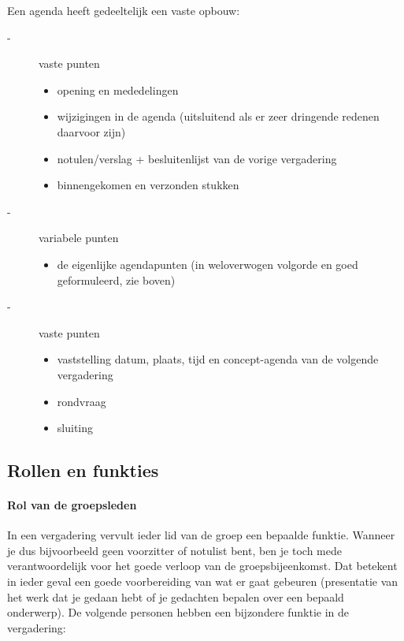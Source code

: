 Een agenda heeft gedeeltelijk een vaste opbouw:
\begin{description}
\item[-]
vaste punten
\begin{itemize}
               \item    opening en mededelingen
               \item    wijzigingen in de agenda (uitsluitend als
                    er zeer dringende redenen daarvoor zijn)
               \item    notulen/verslag + besluitenlijst van de
                    vorige vergadering
               \item    binnengekomen en verzonden stukken
\end{itemize}
\item[-]
variabele punten
\begin{itemize}
              \item    de eigenlijke agendapunten (in weloverwogen
                    volgorde en goed geformuleerd, zie
                    boven)
\end{itemize}
\item[-]
vaste punten
\begin{itemize}
                \item    vaststelling datum, plaats, tijd en 
                    concept-agenda van de volgende vergadering
               \item    rondvraag
               \item    sluiting
\end{itemize}
\end{description}


\subsection{Rollen en funkties}

\paragraph{Rol van de groepsleden}
In een vergadering vervult ieder lid van de groep een bepaalde
funktie. Wanneer je dus bijvoorbeeld geen voorzitter of notulist bent, ben je toch mede verantwoordelijk voor het goede
verloop van de groepsbijeenkomst. Dat betekent in ieder geval
een goede voorbereiding van wat er gaat gebeuren (presentatie
van het werk dat je gedaan hebt of je gedachten bepalen over
een bepaald onderwerp).
De volgende personen hebben een bijzondere funktie in de
vergadering:

